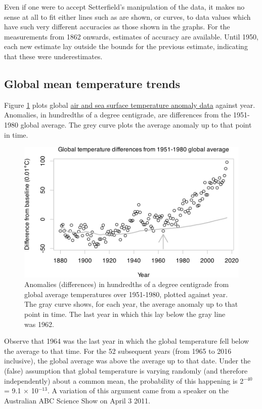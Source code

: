 \documentclass[
  10pt,
  b5paper]{book}
\begin{document}
Even if one were to accept Setterfield's manipulation of the data,
it makes no sense at all to fit either lines such as are shown, or
curves, to data values which have such very different
accuracies as those shown in the graphs. For the
measurements from 1862 onwards, estimates of accuracy are
available. Until 1950, each new estimate lay outside the
bounds for the previous estimate, indicating that these
were underestimates.

\hypertarget{global-mean-temperature-trends}{%
\subsection{Global mean temperature trends}\label{global-mean-temperature-trends}}

Figure \ref{fig:climate} plots global
\href{https://iridl.ldeo.columbia.edu/SOURCES/.NASA/.GISS/.GISSTEMP/.Global/.LOTI/}{air and sea surface temperature anomaly data}
against year. Anomalies, in hundredths of a degree centigrade, are
differences from the 1951-1980 global average. The grey curve plots
the average anomaly up to that point in time.

\begin{figure}[H]

{\centering \includegraphics[width=0.8\linewidth]{07-regress_files/figure-latex/climate-1} 

}

\caption{Anomalies (differences) in hundredths of a degree centigrade
from global average temperatures over 1951-1980, plotted against year.
The gray curve shows, for each year, the average anomaly up to that
point in time.  The last year in which this lay below the gray line
was 1962.}\label{fig:climate}
\end{figure}

Observe that 1964 was the last year in which the global
temperature fell below the average to that time.
For the 52 subsequent years (from 1965 to 2016 inclusive),
the global average was above the average up to that date. Under
the (false) assumption that global temperature is varying
randomly (and therefore independently) about a common mean,
the probability of this happening is 2\(^{-40}\) = 9.1
\(\times\) 10\(^{-13}\). A variation of this argument came
from a speaker on the Australian ABC Science Show on April
3 2011.
\end{document}
